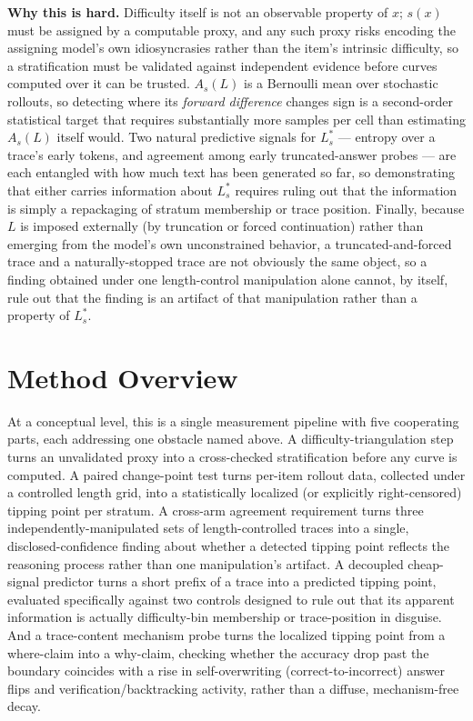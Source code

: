 \documentclass[11pt]{article}
\begin{document}
\noindent\textbf{Why this is hard.} Difficulty itself is not an observable property of $x$; $s(x)$ must be assigned by a computable proxy, and any such proxy risks encoding the assigning model's own idiosyncrasies rather than the item's intrinsic difficulty, so a stratification must be validated against independent evidence before curves computed over it can be trusted. $A_s(L)$ is a Bernoulli mean over stochastic rollouts, so detecting where its \emph{forward difference} changes sign is a second-order statistical target that requires substantially more samples per cell than estimating $A_s(L)$ itself would. Two natural predictive signals for $L^*_s$ --- entropy over a trace's early tokens, and agreement among early truncated-answer probes --- are each entangled with how much text has been generated so far, so demonstrating that either carries information about $L^*_s$ requires ruling out that the information is simply a repackaging of stratum membership or trace position. Finally, because $L$ is imposed externally (by truncation or forced continuation) rather than emerging from the model's own unconstrained behavior, a truncated-and-forced trace and a naturally-stopped trace are not obviously the same object, so a finding obtained under one length-control manipulation alone cannot, by itself, rule out that the finding is an artifact of that manipulation rather than a property of $L^*_s$.

\section{Method Overview}

At a conceptual level, this is a single measurement pipeline with five cooperating parts, each addressing one obstacle named above. A difficulty-triangulation step turns an unvalidated proxy into a cross-checked stratification before any curve is computed. A paired change-point test turns per-item rollout data, collected under a controlled length grid, into a statistically localized (or explicitly right-censored) tipping point per stratum. A cross-arm agreement requirement turns three independently-manipulated sets of length-controlled traces into a single, disclosed-confidence finding about whether a detected tipping point reflects the reasoning process rather than one manipulation's artifact. A decoupled cheap-signal predictor turns a short prefix of a trace into a predicted tipping point, evaluated specifically against two controls designed to rule out that its apparent information is actually difficulty-bin membership or trace-position in disguise. And a trace-content mechanism probe turns the localized tipping point from a where-claim into a why-claim, checking whether the accuracy drop past the boundary coincides with a rise in self-overwriting (correct-to-incorrect) answer flips and verification/backtracking activity, rather than a diffuse, mechanism-free decay.
\end{document}
